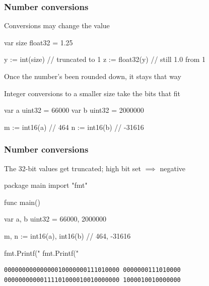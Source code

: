 \documentclass[handout,compress,t,11pt]{beamer}
\begin{document}
\begin{frame}[fragile]
    \frametitle{Number conversions}
    Conversions may change the value
\begin{golang}
var size float32 = 1.25

y := int(size)       // truncated to 1
z := float32(y)      // still 1.0 from 1
\end{golang}
Once the number's been rounded down, it stays that way \par
\vspace{\baselineskip}
Integer conversions to a smaller size take the bits that fit
\begin{golang}
var a uint32 = 66000
var b uint32 = 2000000

m := int16(a)        // 464
n := int16(b)        // -31616
\end{golang}
\end{frame}

\begin{frame}[fragile]
    \frametitle{Number conversions}
The 32-bit values get truncated; high bit set $\implies$ negative
\begin{golang}
package main
import "fmt"

func main() {
    var a, b uint32 = 66000, 2000000

    m, n := int16(a), int16(b) // 464, -31616

    fmt.Printf("%
    fmt.Printf("%
}
\end{golang}
{\small\begin{verbatim}
00000000000000010000000111010000 0000000111010000
00000000000111101000010010000000 1000010010000000
\end{verbatim}}
\end{frame}
\end{document}
